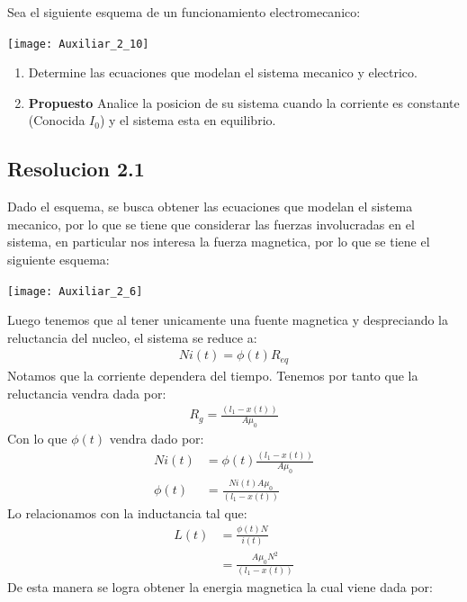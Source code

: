 \documentclass[
  11pt,
  letterpaper,
   addpoints,
   answers
  ]{exam}
\begin{document}
\begin{questions}
\begin{solution}
    \end{solution}
    \question Sea el siguiente esquema de un funcionamiento electromecanico:
    \begin{center}
        \texttt{[image: Auxiliar\_2\_10]}
    \end{center}  
    \begin{enumerate}
        \item Determine las ecuaciones que modelan el sistema mecanico y electrico.
        \item \textbf{Propuesto} Analice la posicion de su sistema cuando la corriente es constante (Conocida $I_{0}$) y el sistema esta en equilibrio. 
    \end{enumerate}
\begin{solution}
\subsection*{Resolucion 2.1}
   Dado el esquema, se busca obtener las ecuaciones que modelan el sistema mecanico, por lo que se tiene que considerar las fuerzas involucradas en el sistema, en particular nos interesa la fuerza magnetica, por lo que se tiene el siguiente esquema:
   \begin{center}
    \texttt{[image: Auxiliar\_2\_6]}
\end{center}
   Luego tenemos que al tener unicamente una fuente magnetica y despreciando la reluctancia del nucleo, el sistema se reduce a:
   \begin{align}
     Ni(t) = \phi(t)R_{eq}
   \end{align}
   Notamos que la corriente dependera del tiempo. Tenemos por tanto que la reluctancia vendra dada por:
    \begin{align}
      R_{g} = \frac{(l_{1}-x(t))}{A \mu_{0}}
    \end{align}
    Con lo que $\phi(t)$ vendra dado por:
    \begin{align}
        Ni(t) &= \phi(t) \frac{(l_{1}-x(t))}{A \mu_{0}}\\
        \phi(t) &= \frac{Ni(t)A\mu_{0}}{(l_{1}-x(t))}
    \end{align}
    Lo relacionamos con la inductancia tal que:
    \begin{align}
        L(t) &= \frac{\phi(t)N}{i(t)}\\
             &= \frac{A\mu_{0}N^{2}}{(l_{1}-x(t))}
    \end{align}
    De esta manera se logra obtener la energia magnetica la cual viene dada por:

\end{solution}
\end{questions}
\end{document}
